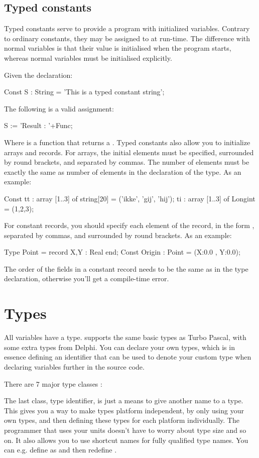 \documentclass{report}
\begin{document}
\section{Typed constants}
Typed constants serve to provide a program with initialized variables.
Contrary to ordinary constants, they may be assigned to at run-time.
The difference with normal variables is that their value is initialised
when the program starts, whereas normal variables must be initialised
explicitly.

Given the declaration:
\begin{listing}
Const
  S : String = 'This is a typed constant string';
\end{listing}
The following is a valid assignment:
\begin{listing}
 S := 'Result : '+Func;
\end{listing}
Where  is a function that returns a .
Typed constants also allow you to initialize arrays and records. For arrays,
the initial elements must be specified, surrounded by round brackets, and
separated by commas. The number of elements must be exactly the same as
number of elements in the declaration of the type. 
As an example:
\begin{listing}
Const 
  tt : array [1..3] of string[20] = ('ikke', 'gij', 'hij');
  ti : array [1..3] of Longint = (1,2,3);
\end{listing}
For constant records, you should specify each element of the record, in the
form , separated by commas, and surrounded by round
brackets.
As an example:
\begin{listing}
Type 
  Point = record
    X,Y : Real
    end;
Const
  Origin : Point = (X:0.0 , Y:0.0); 
\end{listing}
The order of the fields in a constant record needs to be the same as in the type declaration,
otherwise you'll get a compile-time error.
\chapter{Types}
All variables have a type. \fpc supports the same basic types as Turbo
Pascal, with some extra types from Delphi.
You can declare your own types, which is in essence defining an identifier
that can be used to denote your custom type when declaring variables further
in the source code.

There are 7 major type classes :

The last class, {\sffamily type identifier}, is just a means to give another 
name to a type. This gives you a way to make types platform independent, by
only using your own types, and then defining these types for each platform
individually. The programmer that uses your units doesn't have to worry
about type size and so on. It also allows you to use shortcut names for
fully qualified type names. You can e.g. define  as
 and then redefine . 
\end{document}
